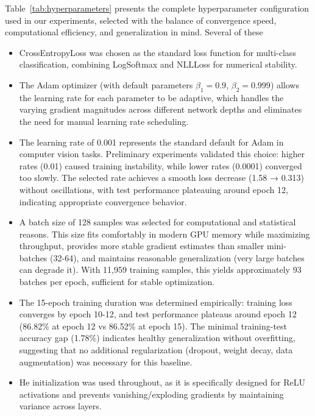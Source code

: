 \documentclass[runningheads]{llncs}
\begin{document}
Table~\ref{tab:hyperparameters} presents the complete hyperparameter configuration used in our experiments, selected with the balance of convergence speed, computational efficiency, and generalization in mind.
Several of these 

\begin{itemize}
    \item CrossEntropyLoss was chosen as the standard loss function for multi-class classification, combining LogSoftmax and NLLLoss for numerical stability.
    \item The Adam optimizer (with default parameters $\beta_1=0.9$, $\beta_2=0.999$) allows the learning rate for each parameter to be adaptive, which handles the varying gradient magnitudes across different network depths and eliminates the need for manual learning rate scheduling.
    \item The learning rate of 0.001 represents the standard default for Adam in computer vision tasks. 
    Preliminary experiments validated this choice: higher rates (0.01) caused training instability, while lower rates (0.0001) converged too slowly. 
    The selected rate achieves a smooth loss decrease (1.58 → 0.313) without oscillations, with test performance plateauing around epoch 12, indicating appropriate convergence behavior.
    \item A batch size of 128 samples was selected for computational and statistical reasons. 
    This size fits comfortably in modern GPU memory while maximizing throughput, provides more stable gradient estimates than smaller mini-batches (32-64), and maintains reasonable generalization (very large batches can degrade it). 
    With 11,959 training samples, this yields approximately 93 batches per epoch, sufficient for stable optimization.
    \item The 15-epoch training duration was determined empirically: training loss converges by epoch 10-12, and test performance plateaus around epoch 12 (86.82\% at epoch 12 vs 86.52\% at epoch 15). 
    The minimal training-test accuracy gap (1.78\%) indicates healthy generalization without overfitting, suggesting that no additional regularization (dropout, weight decay, data augmentation) was necessary for this baseline. 
    \item He initialization was used throughout, as it is specifically designed for ReLU activations and prevents vanishing/exploding gradients by maintaining variance across layers.
\end{itemize}
\end{document}
